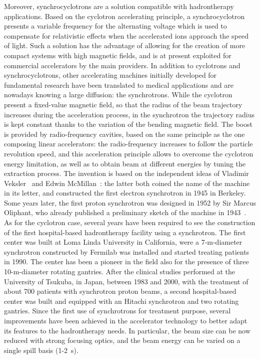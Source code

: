 Moreover, synchrocyclotrons are a solution compatible with hadrontherapy applications. Based on the cyclotron accelerating principle, a synchrocyclotron presents a variable frequency for the alternating voltage which is used to compensate for relativistic effects when the accelerated ions approach the speed of light. Such a solution has the advantage of allowing for the creation of more compact systems with high magnetic fields, and is at present exploited for commercial accelerators by the main providers.  
In addition to cyclotrons and synchrocyclotrons, other accelerating machines  initially developed for fundamental research have been translated to medical applications and are nowadays knowing a large diffusion: the synchrotrons. While the cyclotron present a fixed-value magnetic field, so that the radius of the beam trajectory increases during the acceleration process, in the synchrotron the trajectory radius is kept constant thanks to the variation of the bending magnetic field. The boost is provided by radio-frequency cavities, based on the same principle as the one composing linear accelerators: the radio-frequency increases to follow the particle revolution speed, and this acceleration principle allows to overcome the cyclotron energy limitation, as well as to obtain beam at different energies by tuning the extraction process. The invention is based on the independent ideas of Vladimir Veksler~\parencite{Veksler1944} and Edwin McMillan~\parencite{McMillan1945}: the latter both coined the name of the machine in its letter, and constructed the first electron synchrotron in 1945 in Berkeley. Some years later, the first proton synchrotron was designed in 1952 by Sir Marcus Oliphant, who already published a preliminary sketch of the machine in 1943~\parencite{Oliphant1943}. As for the cyclotron case, several years have been required to see the construction of the first hospital-based hadrontherapy facility using a synchrotron. The first center was built at Loma Linda University in California, were a 7-m-diameter synchrotron constructed by Fermilab was installed and started treating patients in 1990. The center has been a pioneer in the field also for the presence of three 10-m-diameter rotating gantries.  
After the clinical studies performed at the University of Tsukuba, in Japan, between 1983 and 2000, with the treatment of about 700 patients with synchrotron proton beams, a second hospital-based center was built and equipped with an Hitachi synchrotron and two rotating gantries. 
Since the first use of synchrotrons for treatment purpose, several improvements have been achieved in the accelerator technology to better adapt its features to the hadrontherapy needs. In particular, the beam size can be now reduced with strong focusing optics, and the beam energy can be varied on a single spill basis (1-2~s).%
